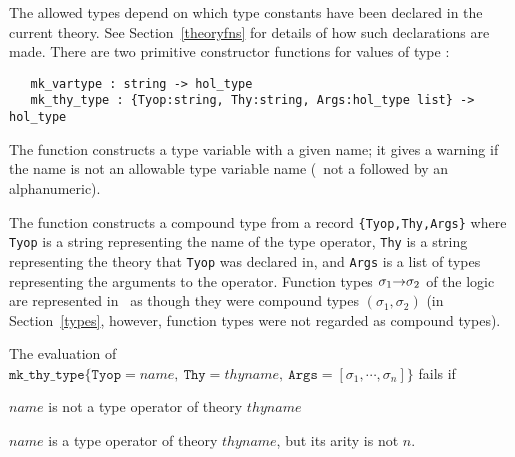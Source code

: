 The allowed types
depend on which type constants have been declared in the
current theory. See Section~\ref{theoryfns} for details of how such
declarations are made. There are two primitive constructor
functions for values of type :


\begin{boxed}
\begin{verbatim}
   mk_vartype : string -> hol_type
   mk_thy_type : {Tyop:string, Thy:string, Args:hol_type list} -> hol_type
\end{verbatim}
\end{boxed}

The function 
 constructs a type variable with a given name;
it gives a warning if the name is not an allowable type variable name (\ie\ not
a  followed by an alphanumeric).

The function  constructs a compound type
from a record {\small\verb+{Tyop,Thy,Args}+} where {\small\verb+Tyop+}
is a string representing the name of the type operator, 
{\small\verb+Thy+} is a string representing the theory that
{\small\verb+Tyop+} was declared in, and {\small\verb+Args+} is  a list of
types representing the arguments to the operator.  Function types
$\sigma_1{\to}\sigma_2$ of the logic are represented in \ML\ as though
they were compound types $(\sigma_1,\sigma_2)$ (in
Section~\ref{types}, however, function types were not regarded as
compound types).

The evaluation of
$\mathtt{mk\_thy\_type}\{\mathtt{Tyop} = \mathit{name},\
\mathtt{Thy} = \mathit{thyname},\ 
\mathtt{Args} = [\sigma_1, \cdots ,\sigma_n]\}$
fails if
\begin{myenumerate}
\item $\mathit{name}$ is not a type operator of theory $\mathit{thyname}$
\item $\mathit{name}$ is a type operator of theory $\mathit{thyname}$,
but its arity is not $n$.
\end{myenumerate}

